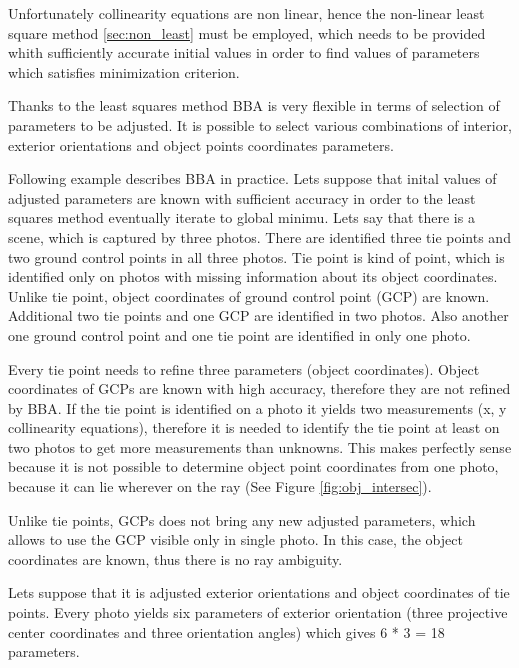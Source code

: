 \documentclass[a4paper,12pt]{article}
\begin{document}
Unfortunately collinearity equations are non linear, hence the non-linear least square method \ref{sec:non_least} must be employed, which 
needs to be provided  whith sufficiently accurate initial values in order to find values of parameters which satisfies minimization criterion.

Thanks to the least squares method BBA is very flexible in terms of selection of parameters to be adjusted. 
It is possible to select various combinations of interior, exterior orientations and object points coordinates parameters. 

Following example describes BBA in practice.
Lets suppose that inital values of adjusted parameters are known with sufficient accuracy in order to the least squares
method eventually iterate to global minimu.
Lets say that there is a scene, which is captured by three photos.
There are identified three tie points and two ground control points in all three photos.
Tie point is kind of point, which is identified only on photos with missing information about its object coordinates.  
Unlike tie point, object coordinates of ground control point (GCP) are known.
Additional two tie points and one GCP are identified in two photos.
Also another one ground control point and one tie point are identified 
in only one photo. 


Every tie point needs to refine three parameters (object coordinates). 
Object coordinates of GCPs are known with high accuracy, therefore they are not refined by BBA. 
If the tie point is identified on a photo it yields two measurements (x, y collinearity equations), 
therefore it is needed to identify the tie point at least on two photos to get more measurements 
than unknowns. This makes perfectly sense because it is not possible to determine object point coordinates from one photo,
because it can lie wherever on the ray (See Figure \ref{fig:obj_intersec}).

Unlike tie points, GCPs does not bring any new adjusted parameters, which 
allows to use the GCP visible only in single photo. In this case, the object coordinates 
are known, thus there is no ray ambiguity. 

Lets suppose that it is adjusted exterior orientations and object coordinates of tie points.  
Every photo yields six parameters of exterior orientation (three projective center coordinates and three orientation angles) 
which gives 6 * 3 = 18 parameters. 
\end{document}
